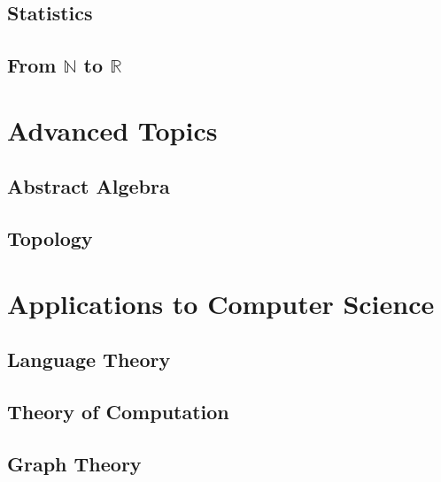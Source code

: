 \documentclass{report}
\theoremstyle{break}
\begin{document}
		\chapter{Statistics}
			
			
		\chapter{From $\mathbb{N}$ to $\mathbb{R}$}
			
	
	\part{Advanced Topics}
	    
	    \chapter{Abstract Algebra}
	        
	    
	    \chapter{Topology}
	        

	\part{Applications to Computer Science}
	
		\chapter{Language Theory}
			
		
		\chapter{Theory of Computation}
			
		
		\chapter{Graph Theory}
			
		
\end{document}
